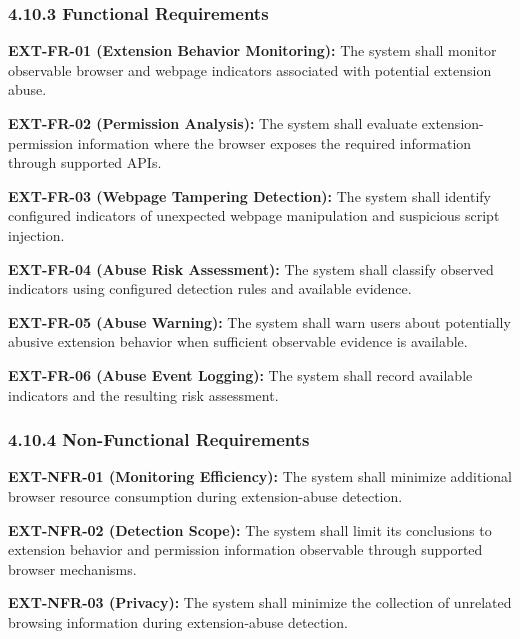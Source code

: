 \documentclass[12pt,a4paper]{report}
\begin{document}
\subsubsection*{4.10.3 Functional Requirements}

\textbf{EXT-FR-01 (Extension Behavior Monitoring):} The system shall monitor observable browser and webpage indicators associated with potential extension abuse.\par

\textbf{EXT-FR-02 (Permission Analysis):} The system shall evaluate extension-permission information where the browser exposes the required information through supported APIs.\par

\textbf{EXT-FR-03 (Webpage Tampering Detection):} The system shall identify configured indicators of unexpected webpage manipulation and suspicious script injection.\par

\textbf{EXT-FR-04 (Abuse Risk Assessment):} The system shall classify observed indicators using configured detection rules and available evidence.\par

\textbf{EXT-FR-05 (Abuse Warning):} The system shall warn users about potentially abusive extension behavior when sufficient observable evidence is available.\par

\textbf{EXT-FR-06 (Abuse Event Logging):} The system shall record available indicators and the resulting risk assessment.\par

\subsubsection*{4.10.4 Non-Functional Requirements}

\textbf{EXT-NFR-01 (Monitoring Efficiency):} The system shall minimize additional browser resource consumption during extension-abuse detection.\par

\textbf{EXT-NFR-02 (Detection Scope):} The system shall limit its conclusions to extension behavior and permission information observable through supported browser mechanisms.\par


\textbf{EXT-NFR-03 (Privacy):} The system shall minimize the collection of unrelated browsing information during extension-abuse detection.\par
\end{document}
